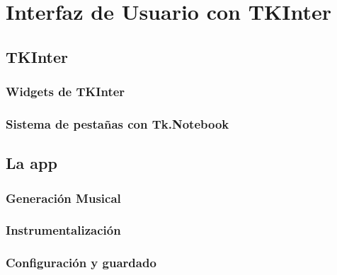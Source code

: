 \chapter{Interfaz de Usuario con TKInter}
\label{cap:GUIconTKInter}

\section{TKInter}
\subsection{Widgets de TKInter}
\subsection{Sistema de pestañas con Tk.Notebook}

\section{La app}
\subsection{Generación Musical}
\subsection{Instrumentalización}
\subsection{Configuración y guardado}
